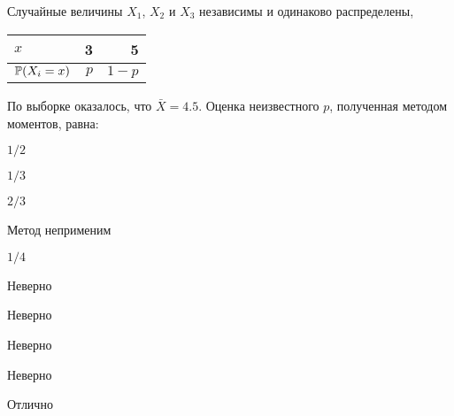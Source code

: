 
\begin{question}
Случайные величины \(X_1\), \(X_2\) и \(X_3\) независимы и одинаково
распределены,

\begin{center}
    \begin{tabular}{lrr} \toprule
    $x$ & 3 & 5 \\
    \midrule
    $\P(X_i = x)$ & $p$ & $1-p$ \\
    \bottomrule
    \end{tabular}
\end{center}

По выборке оказалось, что \(\bar X = 4.5\). Оценка неизвестного \(p\),
полученная методом моментов, равна:
\begin{answerlist}
  \item \(1/2\)
  \item \(1/3\)
  \item \(2/3\)
  \item Метод неприменим
  \item \(1/4\)
\end{answerlist}
\end{question}

\begin{solution}
\begin{answerlist}
  \item Неверно
  \item Неверно
  \item Неверно
  \item Неверно
  \item Отлично
\end{answerlist}
\end{solution}

